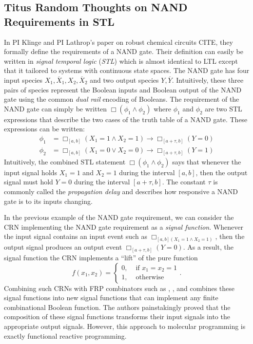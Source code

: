 \subsection*{Titus Random Thoughts on NAND Requirements in STL}
In PI Klinge and PI Lathrop's paper on robust chemical circuits CITE, they formally define the requirements of a NAND gate.
Their definition can easily be written in \emph{signal temporal logic} (\emph{STL}) which is almost identical to LTL except that it tailored to systems with continuous state spaces.
The NAND gate has four input species \( X_1, \overline{X}_1, X_2, \overline{X}_2  \) and two output species \( Y, \overline{Y} \).
Intuitively, these three pairs of species represent the Boolean inputs and Boolean output of the NAND gate using the common \emph{dual rail} encoding of Booleans.
The requirement of the NAND gate can simply be written \( \Box(\phi_1 \land \phi_2) \) where \( \phi_1 \) and \( \phi_2 \) are two STL expressions that describe the two cases of the truth table of a NAND gate.
These expressions can be written:
\begin{align*}
    \phi_1 &= \Box_{[a,b]} (X_1 = 1 \land X_2 = 1) \rightarrow \Box_{[a+\tau, b]} (Y = 0)\\
    \phi_2 &= \Box_{[a,b]} (X_1 = 0 \lor X_2 = 0)  \rightarrow \Box_{[a+\tau, b]} (Y = 1)
\end{align*}
Intuitively, the combined STL statement \( \Box(\phi_1 \land \phi_2) \) says that whenever the input signal holds \( X_1 = 1 \) and \( X_2 = 1 \) during the interval \( [a,b] \), then the output signal must hold \( Y = 0 \) during the interval \( [a+\tau, b] \).
The constant \( \tau \) is commonly called the \emph{propagation delay} and describes how responsive a NAND gate is to its inputs changing.

In the previous example of the NAND gate requirement, we can consider the CRN implementing the NAND gate requirement as a \emph{signal function}.
Whenever the input signal contains an input event such as \( \Box_{[a,b](X_1 = 1 \land X_2 = 1)} \), then the output signal produces an output event \( \Box_{[a+\tau, b]}(Y = 0) \).
As a result, the signal function the CRN implements a ``lift'' of the pure function
\[
    f(x_1, x_2) =
    \begin{cases}
        0, &\text{ if }x_1 = x_2 = 1\\
        1, &\text{ otherwise}
    \end{cases}.
\]
Combining such CRNs with FRP combinators such as \hask{>>>}, \hask{&&&}, and \hask{***} combines these signal functions into new signal functions that can implement any finite combinational Boolean function.
The authors painstakingly proved that the composition of these signal functions transforms their input signals into the appropriate output signals.
However, this approach to molecular programming is exactly functional reactive programming.

